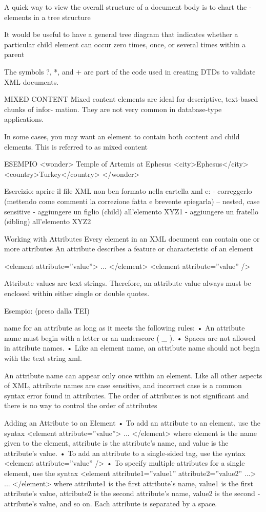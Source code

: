 A quick way to view the overall structure of a document body is to chart the ­elements
in a tree structure

It would be useful to have a general tree diagram that indicates whether a particular
child element can occur zero times, once, or several times within a parent

The symbols ?, *, and + are part of the code used in creating DTDs to validate XML
documents.

MIXED CONTENT
Mixed content elements are ideal for
descriptive, text-based chunks of infor-
mation. They are not very common in
database-type applications.

In some cases, you may want an element to
contain both content and child elements.
This is referred to as mixed content

ESEMPIO
<wonder>
Temple of Artemis at Ephesus
<city>Ephesus</city>
<country>Turkey</country>
</wonder>

Esercizio:
aprire il file XML non ben formato nella cartella xml e:
- correggerlo (mettendo come commenti la correzione fatta e brevente spiegarla)
-- nested, case sensitive
- aggiungere un figlio (child) all'elemento XYZ1
- aggiungere un fratello (sibling) all'elemento XYZ2

Working with Attributes
Every element in an XML document can contain one or more attributes
An attribute
describes a feature or characteristic of an element

<element attribute=”value”> ... </element>
<element attribute=”value” />

Attribute values are text strings. Therefore, an attribute value always must be enclosed
within either single or double quotes.

Esempio:
(preso dalla TEI)

name for an attribute as long as it meets the following rules:
• An attribute name must begin with a letter or an underscore ( _ ).
• Spaces are not allowed in attribute names.
• Like an element name, an attribute name should not begin with the text string xml.

An attribute name can appear only once within an element. Like all other aspects of
XML, attribute names are case sensitive, and incorrect case is a common syntax error
found in attributes.
The order of attributes is not significant and there is no way to control the order of attributes

Adding an Attribute to an Element
• To add an attribute to an element, use the syntax
<element attribute=”value”> ... </element>
where element is the name given to the element, attribute is the ­attribute’s
name, and value is the attribute’s value.
• To add an attribute to a single-sided tag, use the syntax
<element attribute=”value” />
• To specify multiple attributes for a single element, use the syntax
<element attribute1=”value1” attribute2=”value2” ...> ... </element>
where attribute1 is the first attribute’s name, value1 is the first attribute’s value,
attribute2 is the second attribute’s name, value2 is the second ­attribute’s
value, and so on. Each attribute is separated by a space.


